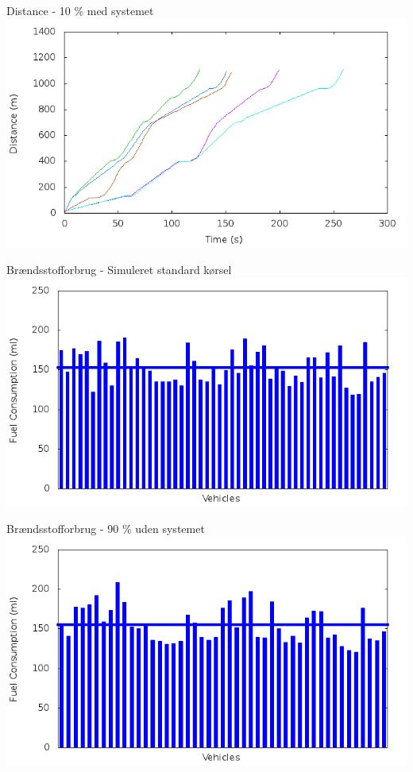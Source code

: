 \begin{frame}{Distance - 10 \% med systemet}
\includegraphics[width=1\textwidth]{images/distanceControlled10.png}
\end{frame}

\begin{frame}{Brændsstofforbrug - Simuleret standard kørsel}
\includegraphics[width=1\textwidth]{images/fuelRouteUncontrolled0.png}
\end{frame}


\begin{frame}{Brændsstofforbrug - 90 \% uden systemet}
\includegraphics[width=1\textwidth]{images/fuelRouteUncontrolled10.png}
\end{frame}

